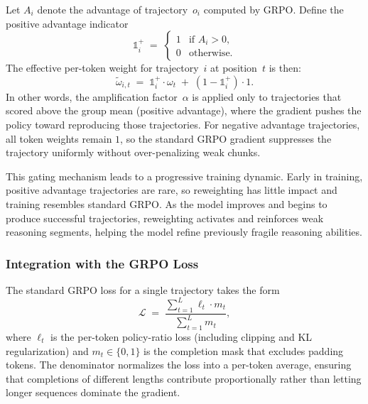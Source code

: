 \documentclass[12pt]{report}
\begin{document}
Let $A_i$ denote the advantage of trajectory~$o_i$ computed by GRPO.
Define the positive advantage indicator
\begin{equation}
  \mathbb{1}^{+}_i \;=\;
  \begin{cases}
    1 & \text{if } A_i > 0, \\
    0 & \text{otherwise}.
  \end{cases}
  \label{eq:pos-adv-gate}
\end{equation}
The effective per-token weight for trajectory~$i$ at position~$t$ is then:
\begin{equation}
  \tilde{\omega}_{i,t} \;=\;
  \mathbb{1}^{+}_i \cdot \omega_t
  \;+\;
  (1 - \mathbb{1}^{+}_i) \cdot 1.
  \label{eq:effective-weight}
\end{equation}
In other words, the amplification factor~$\alpha$ is applied only to
trajectories that scored above the group mean (positive advantage), where
the gradient pushes the policy toward reproducing those trajectories. 
For negative advantage trajectories, all token weights remain $1$, so the standard GRPO gradient suppresses the trajectory uniformly without over-penalizing weak chunks.

This gating mechanism leads to a progressive training dynamic. Early in training, positive advantage trajectories are rare, so reweighting has little impact and training resembles standard GRPO. As the model improves and begins to produce successful trajectories, reweighting activates and reinforces weak reasoning segments, helping the model refine previously fragile reasoning abilities.

\subsubsection{Integration with the GRPO Loss}

The standard GRPO loss for a single trajectory takes the form
\begin{equation}
  \mathcal{L}
  \;=\;
  \frac{\sum_{t=1}^{L} \ell_t \cdot m_t}{\sum_{t=1}^{L} m_t},
  \label{eq:grpo-loss-standard}
\end{equation}
where $\ell_t$ is the per-token policy-ratio loss (including clipping and
KL regularization) and $m_t \in \{0,1\}$ is the completion mask that
excludes padding tokens.  The denominator normalizes the loss into a
per-token average, ensuring that completions of different lengths contribute
proportionally rather than letting longer sequences dominate the gradient.
\end{document}
